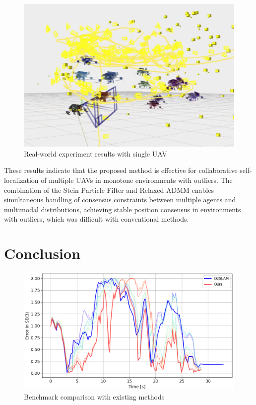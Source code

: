 \documentclass[a4paper,fleqn,10pt,twocolumn]{SICE_ISCS}
\begin{document}
\begin{figure}[t]
	\begin{center}
		\includegraphics[width=\linewidth]{Fig/particle_filter_demo.png}
		\caption{Real-world experiment results with single UAV}
		\label{fig:real_results}
	\end{center}
	\vspace{-2mm}
\end{figure}

These results indicate that the proposed method is effective for collaborative self-localization of multiple UAVs in monotone environments with outliers. The combination of the Stein Particle Filter and Relaxed ADMM enables simultaneous handling of consensus constraints between multiple agents and multimodal distributions, achieving stable position consensus in environments with outliers, which was difficult with conventional methods.

\section{Conclusion}

\begin{figure}[t]
	\begin{center}
		\includegraphics[width=\linewidth]{Fig/benchmark.png}
		\caption{Benchmark comparison with existing methods}
		\label{fig:benchmark}
	\end{center}
	\vspace{-2mm}
\end{figure}
\end{document}
